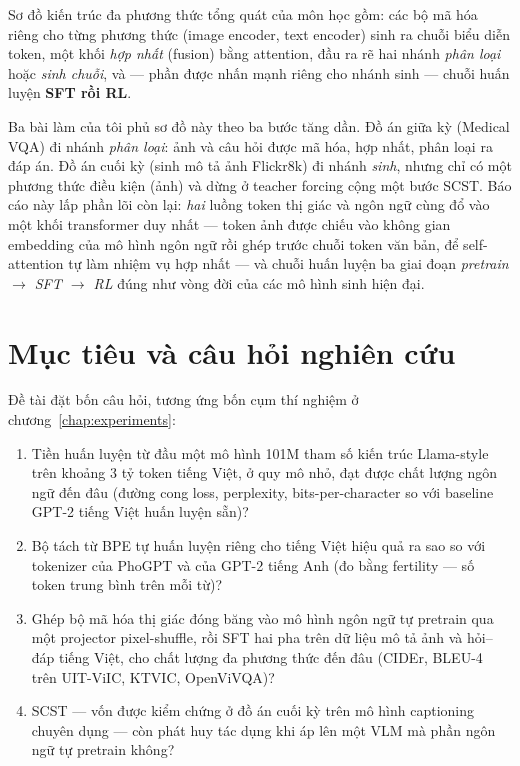 Sơ đồ kiến trúc đa phương thức tổng quát của môn học gồm: các bộ mã hóa riêng
cho từng phương thức (image encoder, text encoder) sinh ra chuỗi biểu diễn
token, một khối \emph{hợp nhất} (fusion) bằng attention, đầu ra rẽ hai nhánh
\emph{phân loại} hoặc \emph{sinh chuỗi}, và --- phần được nhấn mạnh riêng cho
nhánh sinh --- chuỗi huấn luyện \textbf{SFT rồi RL}.

Ba bài làm của tôi phủ sơ đồ này theo ba bước tăng dần. Đồ án giữa kỳ
(Medical VQA) đi nhánh \emph{phân loại}: ảnh và câu hỏi được mã hóa, hợp nhất,
phân loại ra đáp án. Đồ án cuối kỳ (sinh mô tả ảnh Flickr8k) đi nhánh
\emph{sinh}, nhưng chỉ có một phương thức điều kiện (ảnh) và dừng ở teacher
forcing cộng một bước SCST. Báo cáo này lấp phần lõi còn lại: \emph{hai} luồng
token thị giác và ngôn ngữ cùng đổ vào một khối transformer duy nhất --- token
ảnh được chiếu vào không gian embedding của mô hình ngôn ngữ rồi ghép trước
chuỗi token văn bản, để self-attention tự làm nhiệm vụ hợp nhất --- và chuỗi
huấn luyện ba giai đoạn \emph{pretrain $\rightarrow$ SFT $\rightarrow$ RL} đúng
như vòng đời của các mô hình sinh hiện đại.

\section{Mục tiêu và câu hỏi nghiên cứu}

Đề tài đặt bốn câu hỏi, tương ứng bốn cụm thí nghiệm ở chương~\ref{chap:experiments}:
\begin{enumerate}
	\item Tiền huấn luyện từ đầu một mô hình 101M tham số kiến trúc Llama-style
	      trên khoảng 3 tỷ token tiếng Việt, ở quy mô nhỏ, đạt được chất
	      lượng ngôn ngữ đến đâu (đường cong loss, perplexity, bits-per-character
	      so với baseline GPT-2 tiếng Việt huấn luyện sẵn)?
	\item Bộ tách từ BPE tự huấn luyện riêng cho tiếng Việt hiệu quả ra sao so
	      với tokenizer của PhoGPT và của GPT-2 tiếng Anh (đo bằng fertility ---
	      số token trung bình trên mỗi từ)?
	\item Ghép bộ mã hóa thị giác đóng băng vào mô hình ngôn ngữ tự pretrain qua
	      một projector pixel-shuffle, rồi SFT hai pha trên dữ liệu mô tả ảnh và
	      hỏi--đáp tiếng Việt, cho chất lượng đa phương thức đến đâu (CIDEr,
	      BLEU-4 trên UIT-ViIC, KTVIC, OpenViVQA)?
	\item SCST --- vốn được kiểm chứng ở đồ án cuối kỳ trên mô hình captioning
	      chuyên dụng --- còn phát huy tác dụng khi áp lên một VLM mà phần ngôn
	      ngữ tự pretrain không?
\end{enumerate}

